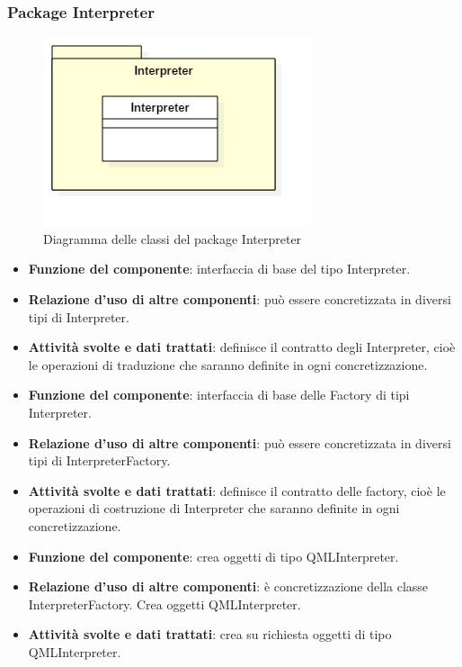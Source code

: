 \subsubsection{Package Interpreter}
\begin{figure}[h!]
\begin{center}
	\includegraphics[scale=0.65]{../images/Interpreter.png}
	\caption{Diagramma delle classi del package Interpreter}
\end{center}
\end{figure}
\begin{itemize}
	\item\textbf{Funzione del componente}: interfaccia di base del tipo Interpreter.
	\item\textbf{Relazione d'uso di altre componenti}: può essere concretizzata in diversi tipi di Interpreter.
	\item\textbf{Attività svolte e dati trattati}: definisce il contratto degli Interpreter, cioè le operazioni di traduzione che saranno definite in ogni concretizzazione.
\end{itemize}
\begin{itemize}
	\item\textbf{Funzione del componente}: interfaccia di base delle Factory di tipi Interpreter.
	\item\textbf{Relazione d'uso di altre componenti}: può essere concretizzata in diversi tipi di InterpreterFactory.
	\item\textbf{Attività svolte e dati trattati}: definisce il contratto delle factory, cioè le operazioni di costruzione di Interpreter che saranno definite in ogni concretizzazione.
\end{itemize}
\begin{itemize}
	\item\textbf{Funzione del componente}: crea oggetti di tipo QMLInterpreter.
	\item\textbf{Relazione d'uso di altre componenti}: è concretizzazione della classe InterpreterFactory. Crea oggetti QMLInterpreter.
	\item\textbf{Attività svolte e dati trattati}: crea su richiesta oggetti di tipo QMLInterpreter.
\end{itemize}
